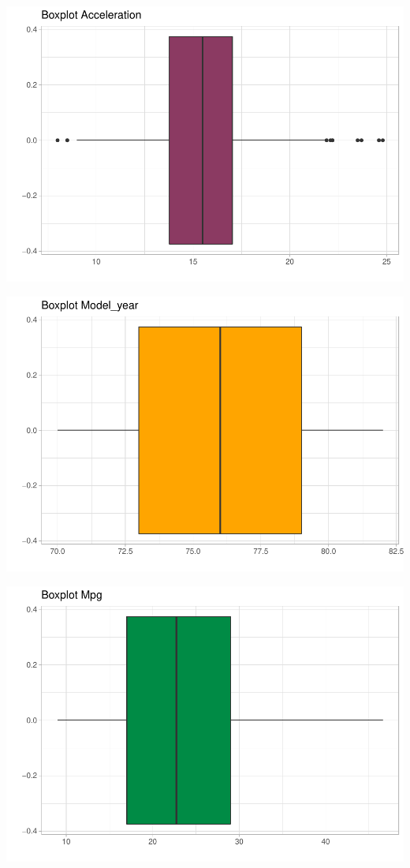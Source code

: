 \documentclass[
]{article}
\begin{document}
\begin{center}\includegraphics{EDA_files/figure-latex/unnamed-chunk-8-4} \end{center}

\begin{center}\includegraphics{EDA_files/figure-latex/unnamed-chunk-8-5} \end{center}

\begin{center}\includegraphics{EDA_files/figure-latex/unnamed-chunk-8-6} \end{center}
\end{document}
